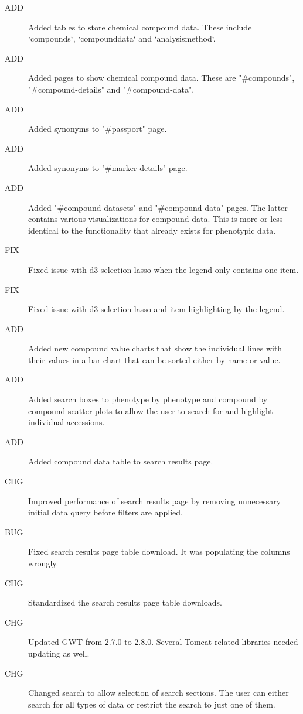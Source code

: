\begin{description}
	\item[ADD]Added tables to store chemical compound data. These include `compounds`, `compounddata` and `analysismethod`.
	\item[ADD]Added pages to show chemical compound data. These are "\#compounds", "\#compound-details" and "\#compound-data".
	\item[ADD]Added synonyms to "\#passport" page.
	\item[ADD]Added synonyms to "\#marker-details" page.
	\item[ADD]Added "\#compound-datasets" and "\#compound-data" pages. The latter contains various visualizations for compound data. This is more or less identical to the functionality that already exists for phenotypic data.
	\item[FIX]Fixed issue with d3 selection lasso when the legend only contains one item.
	\item[FIX]Fixed issue with d3 selection lasso and item highlighting by the legend.
	\item[ADD]Added new compound value charts that show the individual lines with their values in a bar chart that can be sorted either by name or value.
	\item[ADD]Added search boxes to phenotype by phenotype and compound by compound scatter plots to allow the user to search for and highlight individual accessions.
	\item[ADD]Added compound data table to search results page.
	\item[CHG]Improved performance of search results page by removing unnecessary initial data query before filters are applied.
	\item[BUG]Fixed search results page table download. It was populating the columns wrongly.
	\item[CHG]Standardized the search results page table downloads.
	\item[CHG]Updated GWT from 2.7.0 to 2.8.0. Several Tomcat related libraries needed updating as well.
	\item[CHG]Changed search to allow selection of search sections. The user can either search for all types of data or restrict the search to just one of them.
\end{description}

